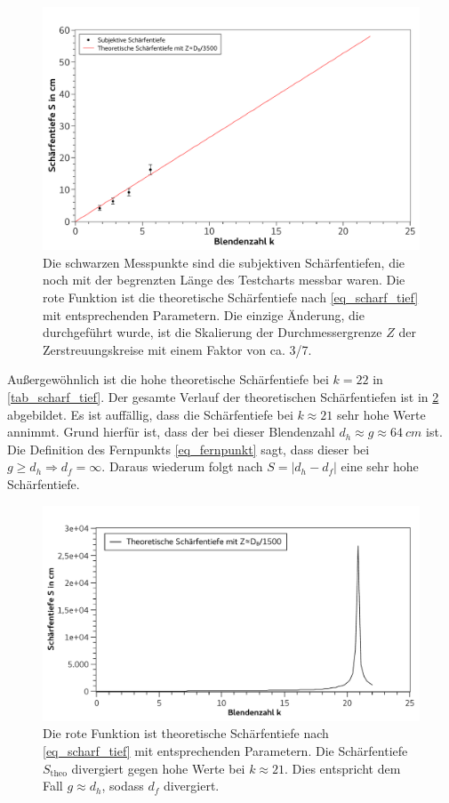 \documentclass[
	a4paper,
	12pt,
	pagesize,
	ngerman
]{scrartcl}
\begin{document}
	\begin{figure}[H]  
		\includegraphics[width=1\textwidth]{fig_scharf_tief}
		\centering
		\caption{Die schwarzen Messpunkte sind die subjektiven Schärfentiefen, die noch mit der begrenzten Länge des Testcharts messbar waren.
			Die rote Funktion ist die theoretische Schärfentiefe nach \cref{eq_scharf_tief} mit entsprechenden Parametern.
			Die einzige Änderung, die durchgeführt wurde, ist die Skalierung der Durchmessergrenze $Z$ der Zerstreuungskreise mit einem Faktor von ca. 3/7.}
		\label{fig_scharf_tief}
		\centering
	\end{figure}

	Außergewöhnlich ist die hohe theoretische Schärfentiefe bei $k=22$ in \cref{tab_scharf_tief}.
	Der gesamte Verlauf der theoretischen Schärfentiefen ist in \cref{fig_scharf_tief_theo} abgebildet.
	Es ist auffällig, dass die Schärfentiefe bei $k\approx21$ sehr hohe Werte annimmt.
	Grund hierfür ist, dass der bei dieser Blendenzahl $d_h\approx g\approx\SI{64}{cm}$ ist.
	Die Definition des Fernpunkts \cref{eq_fernpunkt} sagt, dass dieser bei $g\geq d_h \Rightarrow d_f=\infty$.
	Daraus wiederum folgt nach $S=|d_h-d_f|$ eine sehr hohe Schärfentiefe.

	\begin{figure}[H]  
		\includegraphics[width=1\textwidth]{fig_scharf_tief_theo}
		\centering
		\caption{
			Die rote Funktion ist theoretische Schärfentiefe nach \cref{eq_scharf_tief} mit entsprechenden Parametern.
			Die Schärfentiefe $S_\text{theo}$ divergiert gegen hohe Werte bei $k\approx21$.
			Dies entspricht dem Fall $g\approx d_h$, sodass $d_f$ divergiert.
			}
		\label{fig_scharf_tief_theo}
		\centering
	\end{figure}
\end{document}
